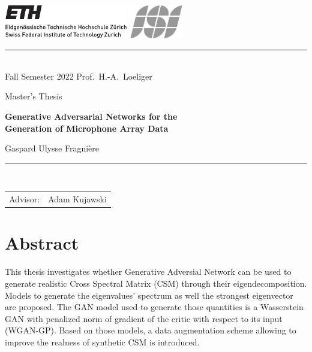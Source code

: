 \documentclass[11pt,a4paper,twoside]{report}
\begin{document}
\pagestyle{plain}
\lfoot{}
\cfoot{\thepage}
\rfoot{}
     
\begin{titlepage}
  \begin{center}
    \includegraphics[height=15mm]{resources/ethlogo} 
    \hfill
    \includegraphics[height=15mm]{resources/isilogo_plain_bw}

    \rule{\textwidth}{0.5pt}\\[1ex]
    {\Large Fall Semester 2022 \hfill 
      Prof.~H.-A.~Loeliger
    }

    \LARGE
    Master's Thesis

    \Huge\textbf{
        Generative Adversarial Networks for the\\
        Generation of Microphone Array Data
    }

    
    \LARGE{
      Gaspard Ulysse Fragnière
    }
    
  \end{center}
  \rule{\textwidth}{0.5pt}\\[2ex]
  \noindent
  \begin{tabular}{@{}ll@{}}
    \Large Advisor: & \Large Adam Kujawski\\[1ex]
  \end{tabular}
\end{titlepage}


\cleardoublepage

\thispagestyle{empty}
\chapter*{Abstract}

This thesis investigates whether Generative Adversial Network can be used to generate realistic Cross Spectral Matrix (CSM) through their eigendecomposition. Models to generate the eigenvalues' spectrum as well the strongest eigenvector are proposed. The GAN model used to generate those quantities is a Wasserstein GAN with penalized norm of gradient of the critic with respect to its input (WGAN-GP). Based on those models, a data augmentation scheme allowing to improve the realness of synthetic CSM is introduced. 
\end{document}
